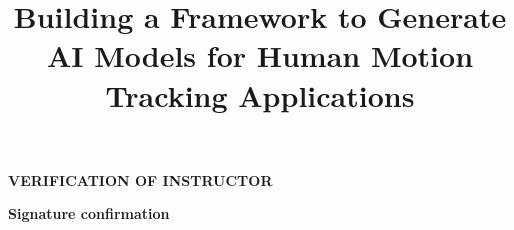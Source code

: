 \documentclass[final,oneside]{hcmut-thesis}
\title{Building a Framework to Generate AI Models for Human Motion Tracking Applications}
\begin{document}
\coverpage%

\frontmatter%
\begin{center}
\textbf{\large VERIFICATION OF INSTRUCTOR}
\end{center}

\vspace{15 cm}
\hspace{9 cm} \textbf{\large Signature confirmation}\\
\vspace{3 cm}





\tableofcontents
\clearpage
\listoftables
\clearpage
\listoffigures

\mainmatter%











\end{document}
